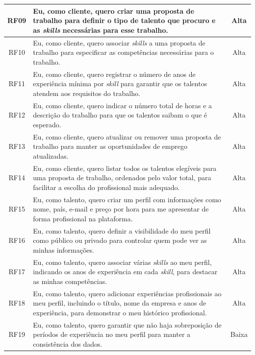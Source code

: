 \begin{center}
\begin{longtable}{|c|p{9cm}|c|}
    \hline
    RF09 & Eu, como cliente, quero criar uma proposta de trabalho para definir o tipo de talento que procuro e as \textit{skills} necessárias para esse trabalho. & Alta \\
    \hline
    RF10 & Eu, como cliente, quero associar \textit{skills} a uma proposta de trabalho para especificar as competências necessárias para o trabalho. & Alta \\
    \hline
    RF11 & Eu, como cliente, quero registrar o número de anos de experiência mínima por \textit{skill} para garantir que os talentos atendem aos requisitos do trabalho. & Alta \\
    \hline
    RF12 & Eu, como cliente, quero indicar o número total de horas e a descrição do trabalho para que os talentos saibam o que é esperado. & Alta \\
    \hline
    RF13 & Eu, como cliente, quero atualizar ou remover uma proposta de trabalho para manter as oportunidades de emprego atualizadas. & Alta \\
    \hline
    RF14 & Eu, como cliente, quero listar todos os talentos elegíveis para uma proposta de trabalho, ordenados pelo valor total, para facilitar a escolha do profissional mais adequado. & Alta \\
    \hline
    RF15 & Eu, como talento, quero criar um perfil com informações como nome, país, e-mail e preço por hora para me apresentar de forma profissional na plataforma. & Alta \\
    \hline
    RF16 & Eu, como talento, quero definir a visibilidade do meu perfil como público ou privado para controlar quem pode ver as minhas informações. & Alta \\
    \hline
    RF17 & Eu, como talento, quero associar várias \textit{skills} ao meu perfil, indicando os anos de experiência em cada \textit{skill}, para destacar as minhas competências. & Alta \\
    \hline
    RF18 & Eu, como talento, quero adicionar experiências profissionais ao meu perfil, incluindo o título, nome da empresa e anos de experiência, para demonstrar o meu histórico profissional. & Alta \\
    \hline
    RF19 & Eu, como talento, quero garantir que não haja sobreposição de períodos de experiência no meu perfil para manter a consistência dos dados. & Baixa \\
    \hline
\end{longtable}
\end{center}

